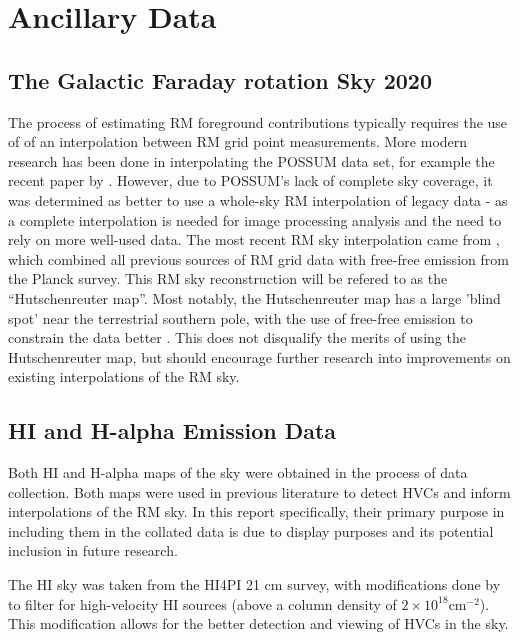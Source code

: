 \section{Ancillary Data}
\label{sec:data}

\subsection{The Galactic Faraday rotation Sky 2020}
\label{ssec:legacy}

The process of estimating RM foreground contributions typically requires the use of of an interpolation between RM grid point measurements. More modern research has been done in interpolating the POSSUM data set, for example the recent paper by \cite{ID58}. However, due to POSSUM's lack of complete sky coverage, it was determined as better to use a whole-sky RM interpolation of legacy data - as a complete interpolation is needed for image processing analysis and the need to rely on more well-used data. The most recent RM sky interpolation came from \cite{ID44, ID45}, which combined all previous sources of RM grid data with free-free emission from the Planck survey. This RM sky reconstruction will be refered to as the “Hutschenreuter map”. Most notably, the Hutschenreuter map has a large 'blind spot' near the terrestrial southern pole, with the use of free-free emission to constrain the data better \citep{ID44, ID45}. This does not disqualify the merits of using the Hutschenreuter map, but should encourage further research into improvements on existing interpolations of the RM sky.

\subsection{HI and H-alpha Emission Data}
\label{ssec:other_data}

Both HI and H-alpha maps of the sky were obtained in the process of data collection. Both maps were used in previous literature to detect HVCs and inform interpolations of the RM sky. In this report specifically, their primary purpose in including them in the collated data is due to display purposes and its potential inclusion in future research. 


The HI sky was taken from the HI4PI 21 cm survey, with modifications done by \cite{ID6} to filter for high-velocity HI sources (above a column density of $2\times 10^{18} \mathrm{cm}^{-2}$). This modification allows for the better detection and viewing of HVCs in the sky.


